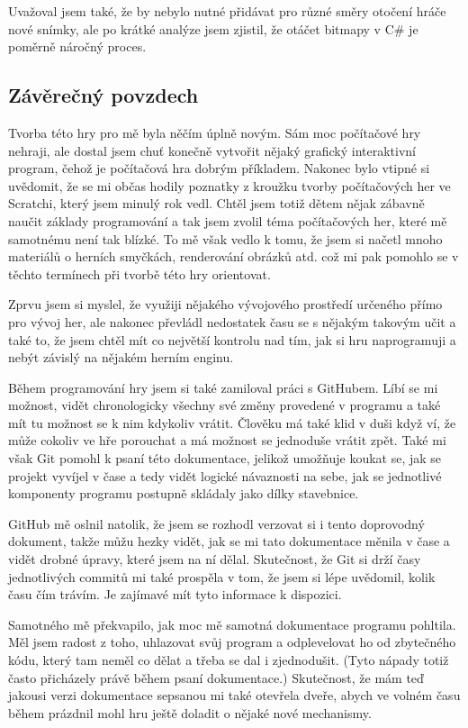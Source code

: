 \documentclass[a4]{article}
\begin{document}
Uvažoval jsem také, že by nebylo nutné přidávat pro různé směry otočení hráče nové snímky, ale po krátké analýze jsem zjistil, že otáčet bitmapy v C\# je poměrně náročný proces.

\subsection{Závěrečný povzdech}
Tvorba této hry pro mě byla něčím úplně novým. Sám moc počítačové hry nehraji, ale dostal jsem chuť konečně vytvořit nějaký grafický interaktivní program, čehož je počítačová hra dobrým příkladem. Nakonec bylo vtipné si uvědomit, že se mi občas hodily poznatky z kroužku tvorby počítačových her ve Scratchi, který jsem minulý rok vedl. Chtěl jsem totiž dětem nějak zábavně naučit základy programování a tak jsem zvolil téma počítačových her, které mě samotnému není tak blízké. To mě však vedlo k tomu, že jsem si načetl mnoho materiálů o herních smyčkách, renderování obrázků atd. což mi pak pomohlo se v těchto termínech při tvorbě této hry orientovat. 

Zprvu jsem si myslel, že využiji nějakého vývojového prostředí určeného přímo pro vývoj her, ale nakonec převládl nedostatek času se s nějakým takovým učit a také to, že jsem chtěl mít co největší kontrolu nad tím, jak si hru naprogramuji a nebýt závislý na nějakém herním enginu.

Během programování hry jsem si také zamiloval práci s GitHubem. Líbí se mi možnost, vidět chronologicky všechny své změny provedené v programu a také mít tu možnost se k nim kdykoliv vrátit. Člověku má také klid v duši když ví, že může cokoliv ve hře porouchat a má možnost se jednoduše vrátit zpět. Také mi však Git pomohl k psaní této dokumentace, jelikož umožňuje koukat se, jak se projekt vyvíjel v čase a tedy vidět logické návaznosti na sebe, jak se jednotlivé komponenty programu postupně skládaly jako dílky stavebnice.

GitHub mě oslnil natolik, že jsem se rozhodl verzovat si i tento doprovodný dokument, takže můžu hezky vidět, jak se mi tato dokumentace měnila v čase a vidět drobné úpravy, které jsem na ní dělal. Skutečnost, že Git si drží časy jednotlivých commitů mi také prospěla v tom, že jsem si lépe uvědomil, kolik času čím trávím. Je zajímavé mít tyto informace k dispozici.

Samotného mě překvapilo, jak moc mě samotná dokumentace programu pohltila. Měl jsem radost z toho, uhlazovat svůj program a odplevelovat ho od zbytečného kódu, který tam neměl co dělat a třeba se dal i zjednodušit. (Tyto nápady totiž často přicházely právě během psaní dokumentace.) Skutečnost, že mám teď jakousi verzi dokumentace sepsanou mi také otevřela dveře, abych ve volném času během prázdnil mohl hru ještě doladit o nějaké nové mechanismy. 
\end{document}
